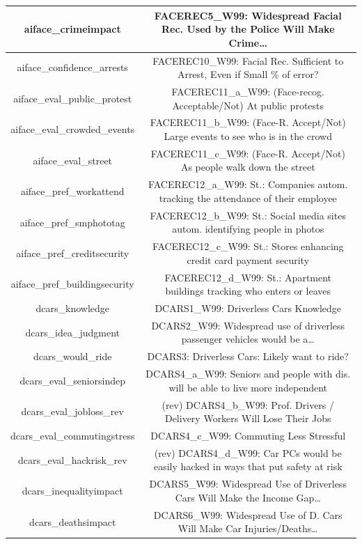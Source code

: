 {\begin{tabular}{c | c}
  \hline
  aiface\_crimeimpact & FACEREC5\_W99: Widespread Facial Rec. Used by the Police Will Make Crime… \\
  \hline
  aiface\_confidence\_arrests & FACEREC10\_W99: Facial Rec. Sufficient to Arrest, Even if Small \% of error? \\
  \hline
  aiface\_eval\_public\_protest & FACEREC11\_a\_W99: (Face-recog. Acceptable/Not) At public protests \\
  \hline
  aiface\_eval\_crowded\_events & FACEREC11\_b\_W99: (Face-R. Accept/Not) Large events to see who is in the crowd \\
  \hline
  aiface\_eval\_street & FACEREC11\_c\_W99: (Face-R. Accept/Not) As people walk down the street \\
  \hline
  aiface\_pref\_workattend & FACEREC12\_a\_W99: St.: Companies autom. tracking the attendance of their employee \\
  \hline
  aiface\_pref\_smphototag & FACEREC12\_b\_W99: St.: Social media sites autom. identifying people in photos \\
  \hline
  aiface\_pref\_creditsecurity & FACEREC12\_c\_W99: St.: Stores enhancing credit card payment security \\
  \hline
  aiface\_pref\_buildingsecurity & FACEREC12\_d\_W99: St.: Apartment buildings tracking who enters or leaves \\
  \hline
  dcars\_knowledge & DCARS1\_W99: Driverless Cars Knowledge \\
  \hline
  dcars\_idea\_judgment & DCARS2\_W99: Widespread use of driverless passenger vehicles would be a… \\
  \hline
  dcars\_would\_ride & DCARS3: Driverless Cars: Likely want to ride? \\
  \hline
  dcars\_eval\_seniorsindep & DCARS4\_a\_W99: Seniors and people with dis. will be able to live more independent \\
  \hline
  dcars\_eval\_jobloss\_rev & (rev) DCARS4\_b\_W99: Prof. Drivers / Delivery Workers Will Lose Their Jobs \\
  \hline
  dcars\_eval\_commutingstress & DCARS4\_c\_W99: Commuting Less Stressful \\
  \hline
  dcars\_eval\_hackrisk\_rev & (rev) DCARS4\_d\_W99: Car PCs would be easily hacked in ways that put safety at risk \\
  \hline
  dcars\_inequalityimpact & DCARS5\_W99: Widespread Use of Driverless Cars Will Make the Income Gap… \\
  \hline
  dcars\_deathsimpact & DCARS6\_W99: Widespread Use of D. Cars Will Make Car Injuries/Deaths… \\

\end{tabular}}
